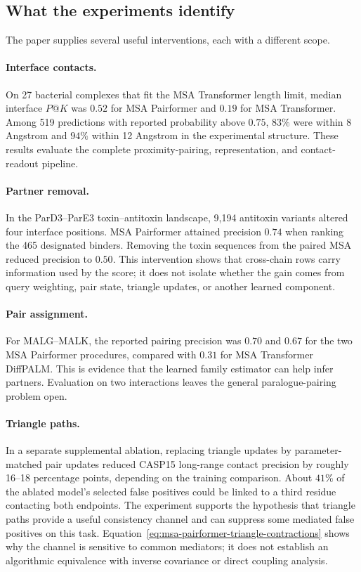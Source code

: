 \subsection{What the experiments identify}

The paper supplies several useful interventions, each with a different scope.

\paragraph{Interface contacts.}
On 27 bacterial complexes that fit the MSA Transformer length limit, median interface $P@K$ was
$0.52$ for MSA Pairformer and $0.19$ for MSA Transformer.  Among 519 predictions with reported
probability above $0.75$, $83\%$ were within 8 Angstrom and $94\%$ within 12 Angstrom in the
experimental structure.  These results evaluate the complete proximity-pairing, representation,
and contact-readout pipeline.

\paragraph{Partner removal.}
In the ParD3--ParE3 toxin--antitoxin landscape, 9,194 antitoxin variants altered four interface
positions.  MSA Pairformer attained precision $0.74$ when ranking the 465 designated binders.
Removing the toxin sequences from the paired MSA reduced precision to $0.50$.  This intervention
shows that cross-chain rows carry information used by the score; it does not isolate whether the
gain comes from query weighting, pair state, triangle updates, or another learned component.

\paragraph{Pair assignment.}
For MALG--MALK, the reported pairing precision was $0.70$ and $0.67$ for the two MSA Pairformer
procedures, compared with $0.31$ for MSA Transformer DiffPALM.  This is evidence that the learned
family estimator can help infer partners.  Evaluation on two interactions leaves the general
paralogue-pairing problem open.

\paragraph{Triangle paths.}
In a separate supplemental ablation, replacing triangle updates by parameter-matched pair updates
reduced CASP15 long-range contact precision by roughly 16--18 percentage points, depending on the
training comparison.  About $41\%$ of the ablated model's selected false positives could be linked
to a third residue contacting both endpoints.  The experiment supports the hypothesis that
triangle paths provide a useful consistency channel and can suppress some mediated false positives
on this task.  Equation~\ref{eq:msa-pairformer-triangle-contractions} shows why the channel is
sensitive to common mediators; it does not establish an algorithmic equivalence with inverse
covariance or direct coupling analysis.


